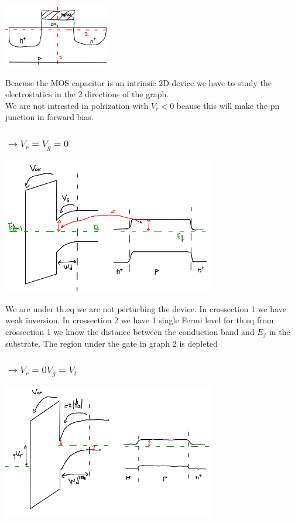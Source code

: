 \centering
\includegraphics[width=0.35\textwidth]{sections.png}\\
\raggedright

Beacuse the MOS capacitor is an intrinsic 2D device we have to study the electrostatics in the 2 directions of the graph. \\ 
We are not intrested in polrization with $V_r<0$ beause this will make the pn junction in forward bias.\\

\subsubsection{$\rightarrow V_r=V_g=0$}

\centering
\includegraphics[width=0.7\textwidth]{theqmosr.png}\\
\raggedright

We are under th.eq we are not perturbing the device. In crossection 1 we have weak inversion. In crossection 2 we have 1 single Fermi level for th.eq from crossection 1 we know the distance between the conduction band and $E_f$ in the substrate. The region under the gate in graph 2 is depleted

\subsubsection{$\rightarrow V_r=0 V_g=V_t$}

\centering
\includegraphics[width=0.7\textwidth]{what1.png}\\
\raggedright

